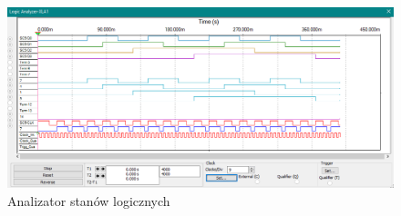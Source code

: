 \documentclass{article}
\begin{document}
\begin{figure}[H]
    \centering
    \includegraphics[width=\textwidth]{3b_test_ana.png}
    \caption{Analizator stanów logicznych}
\end{figure}
\end{document}
